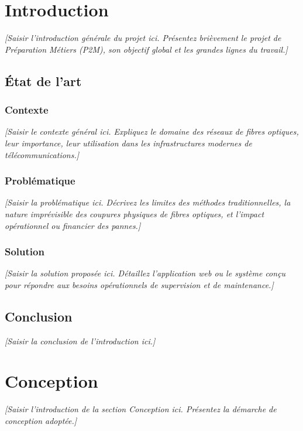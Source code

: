 \documentclass[11pt,a4paper]{article}
\begin{document}
\section{Introduction}
\textit{[Saisir l'introduction générale du projet ici. Présentez brièvement le projet de Préparation Métiers (P2M), son objectif global et les grandes lignes du travail.]}

\subsection{État de l’art}

\subsubsection{Contexte}
\textit{[Saisir le contexte général ici. Expliquez le domaine des réseaux de fibres optiques, leur importance, leur utilisation dans les infrastructures modernes de télécommunications.]}

\subsubsection{Problématique}
\textit{[Saisir la problématique ici. Décrivez les limites des méthodes traditionnelles, la nature imprévisible des coupures physiques de fibres optiques, et l'impact opérationnel ou financier des pannes.]}

\subsubsection{Solution}
\textit{[Saisir la solution proposée ici. Détaillez l'application web ou le système conçu pour répondre aux besoins opérationnels de supervision et de maintenance.]}

\subsection{Conclusion}
\textit{[Saisir la conclusion de l'introduction ici.]}

\newpage

\section{Conception}
\textit{[Saisir l'introduction de la section Conception ici. Présentez la démarche de conception adoptée.]}
\end{document}
